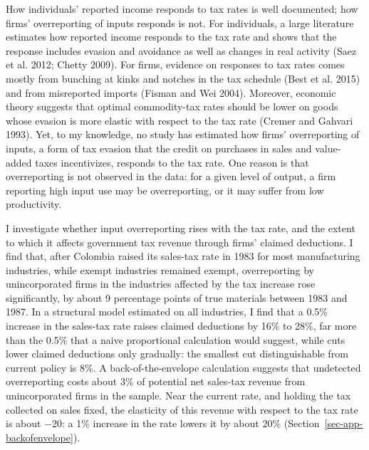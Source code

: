 \documentclass[
  12pt,
  letterpaper,
  oneside,
  openany]{report}
\begin{document}
How individuals' reported income responds to tax rates is well
documented; how firms' overreporting of inputs responds is not. For
individuals, a large literature estimates how reported income responds
to the tax rate and shows that the response includes evasion and
avoidance as well as changes in real activity (Saez et al. 2012; Chetty
2009). For firms, evidence on responses to tax rates comes mostly from
bunching at kinks and notches in the tax schedule (Best et al. 2015) and
from misreported imports (Fisman and Wei 2004). Moreover, economic
theory suggests that optimal commodity-tax rates should be lower on
goods whose evasion is more elastic with respect to the tax rate (Cremer
and Gahvari 1993). Yet, to my knowledge, no study has estimated how
firms' overreporting of inputs, a form of tax evasion that the credit on
purchases in sales and value-added taxes incentivizes, responds to the
tax rate. One reason is that overreporting is not observed in the data:
for a given level of output, a firm reporting high input use may be
overreporting, or it may suffer from low productivity.

I investigate whether input overreporting rises with the tax rate, and
the extent to which it affects government tax revenue through firms'
claimed deductions. I find that, after Colombia raised its sales-tax
rate in 1983 for most manufacturing industries, while exempt industries
remained exempt, overreporting by unincorporated firms in the industries
affected by the tax increase rose significantly, by about 9 percentage
points of true materials between 1983 and 1987. In a structural model
estimated on all industries, I find that a 0.5\% increase in the
sales-tax rate raises claimed deductions by 16\% to 28\%, far more than
the 0.5\% that a naive proportional calculation would suggest, while
cuts lower claimed deductions only gradually: the smallest cut
distinguishable from current policy is 8\%. A back-of-the-envelope
calculation suggests that undetected overreporting costs about 3\% of
potential net sales-tax revenue from unincorporated firms in the sample.
Near the current rate, and holding the tax collected on sales fixed, the
elasticity of this revenue with respect to the tax rate is about −20: a
1\% increase in the rate lowers it by about 20\%
(Section~\ref{sec-app-backofenvelope}).
\end{document}
